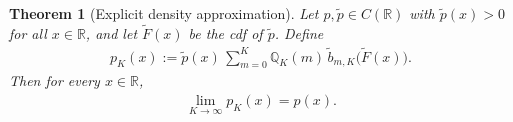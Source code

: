 \documentclass{article}
\newtheorem{theorem}{Theorem}[section]
\begin{document}

\begin{theorem}[Explicit density approximation]\label{theorem:general_forward_pushforward_expanded}
Let \(p,\tilde p\in C(\mathbb{R})\) with \(\tilde p(x)>0\) for all \(x\in\mathbb{R}\), and let $\tilde F(x)$ be the cdf of \(\tilde p\).  Define
\begin{align}\label{eq:pK definition}
p_K(x)
:=\tilde p(x)\,\sum_{m=0}^{K}\mathbb{Q}_{K}(m)\,\tilde b_{m,K}\!\bigl(\tilde F(x)\bigr).
\end{align}
Then for every \(x\in\mathbb{R}\),
\begin{align*}
\lim_{K\to\infty}p_K(x)
= p(x).
\end{align*}
\end{theorem}
\end{document}
